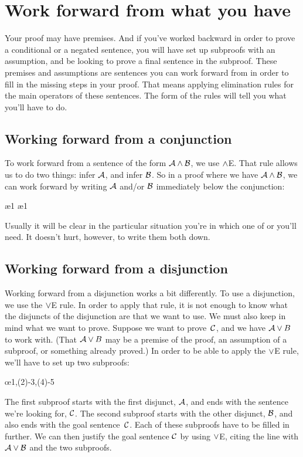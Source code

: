 \section{Work forward from what you have}

Your proof may have premises. And if you've worked backward in order to prove a conditional or a negated sentence, you will have set up subproofs with an assumption, and be looking to prove a final sentence in the subproof. These premises and assumptions are sentences you can work forward from in order to fill in the missing steps in your proof. That means applying elimination rules for the main operators of these sentences. The form of the rules will tell you what you'll have to do. 

\subsection*{Working forward from a conjunction}

To work forward from a sentence of the form $\mathcal{A} \wedge \mathcal{B}$, we use $\wedge$E. That rule allows us to do two things: infer $\mathcal{A}$, and infer $\mathcal{B}$. So in a proof where we have $\mathcal{A} \wedge \mathcal{B}$, we can work forward by writing $\mathcal{A}$ and/or $\mathcal{B}$ immediately below the conjunction:
\begin{fitchproof}
  \ae{1}
  \ae{1}
\end{fitchproof}
Usually it will be clear in the particular situation you're in which one of  or  you'll need. It doesn't hurt, however, to write them both down.

\subsection*{Working forward from a disjunction}

Working forward from a disjunction works a bit differently. To use a disjunction, we use the $\vee$E rule. In order to apply that rule, it is not enough to know what the disjuncts of the disjunction are that we want to use. We must also keep in mind what we want to prove. Suppose we want to prove~$\mathcal{C}$, and we have $\mathcal{A} \vee B$ to work with. (That $\mathcal{A} \vee B$ may be a premise of the proof, an assumption of a subproof, or something already proved.) In order to be able to apply the $\vee$E rule, we'll have to set up two subproofs:
\begin{fitchproof}
	\open
	\ellipsesline 
	\close 
	\open
	\ellipsesline
	\close
	\oe{1,(2)-3,(4)-5} 
\end{fitchproof} 
The first subproof starts with the first disjunct, $\mathcal{A}$, and ends with the sentence we're looking for, $\mathcal{C}$. The second subproof starts with the other disjunct, $\mathcal{B}$, and also ends with the goal sentence~$\mathcal{C}$. Each of these subproofs have to be filled in further. We can then justify the goal sentence $\mathcal{C}$ by using $\vee$E, citing the line with $\mathcal{A} \vee \mathcal{B}$ and the two subproofs.

